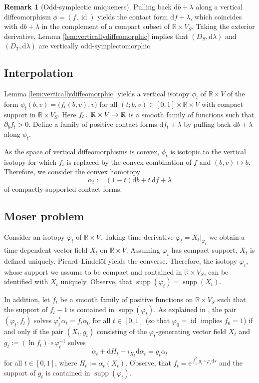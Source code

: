 \documentclass{amsart}
\theoremstyle{definition}
\newtheorem{rem}[prop]{Remark}
\def\co{\colon\thinspace}
\newcommand{\rmd}{\mathrm d}
\newcommand{\rme}{\mathrm e}
\newcommand{\R}{\mathbb R}
\newcommand{\ra}{\rightarrow}
\DeclareMathOperator{\id}{\mathrm{id}}
\DeclareMathOperator{\supp}{\mathrm{supp}}
\begin{document}
\begin{rem}[Odd-symplectic uniqueness]
\label{rem:oddsympuniness}
Pulling back $\rmd b+\lambda$
along a vertical diffeomorphism $\phi=(f,\id)$
yields the contact form $\rmd f+\lambda$,
which coincides with $\rmd b+\lambda$ in the complement
of a compact subset of $\R\times V_S$.
Taking the exterior derivative,
Lemma \ref{lem:verticallydiffeomorphic} implies that
$(D_S,\rmd\lambda)$ and $(D_T,\rmd\lambda)$
are vertically odd-symplectomorphic.
\end{rem}




\subsection{Interpolation}
\label{subsec:interpolation}


Lemma \ref{lem:verticallydiffeomorphic} yields a
vertical isotopy $\phi_t$ of $\R\times V$
of the form $\phi_t(b,v)=\big(f_t(b,v),v\big)$
for all $(t;b,v)\in[0,1]\times\R\times V$
with compact support in $\R\times V_S$.
Here $f_t\co\R\times V\ra\R$ is a smooth family of functions
such that $\partial_bf_t>0$.
Define a family of positive contact forms
$\rmd f_t+\lambda$ by pulling back
$\rmd b+\lambda$ along $\phi_t$.

As the space of vertical diffeomorphisms is convex,
$\phi_t$ is isotopic to the vertical isotopy
for which $f_t$ is replaced by the convex combination
of $f$ and $(b,v)\mapsto b$.
Therefore, we consider the convex homotopy
\[
\alpha_t:=(1-t)\rmd b+t\,\rmd f+\lambda
\]
of compactly supported contact forms.




\subsection{Moser problem}
\label{subsec:moserproblem}


Consider an isotopy $\varphi_t$ of $\R\times V$.
Taking time-derivative $\dot{\varphi_t}=X_t|_{\varphi_t}$
we obtain a time-dependent vector field $X_t$ on $\R\times V$.
Assuming $\varphi_t$ has compact support,
$X_t$ is defined uniquely.
Picard--Lindel\"of yields the converse.
Therefore, the isotopy $\varphi_t$,
whose support we assume to be compact
and contained in $\R\times V_S$,
can be identified with $X_t$ uniquely.
Observe, that $\supp(\varphi_t)=\supp(X_t)$.

In addition,
let $f_t$ be a smooth family of positive functions on $\R\times V_S$
such that the support of $f_t-1$ is contained in $\supp(\varphi_t)$.
As explained in \cite{gei08},
the pair $(\varphi_t,f_t)$ solves $\varphi_t^*\alpha_t=f_t\alpha_0$
for all $t\in[0,1]$
(so that $\varphi_0=\id$ implies $f_0=1$)
if and only if
the pair $(X_t,g_t)$ consisting of the $\varphi_t$-generating
vector field $X_t$ and $g_t:=(\ln f_t)\,\dot{}\circ\varphi_t^{-1}$
solves
\[
\dot\alpha_t+\rmd H_t+i_{X_t}\rmd\alpha_t=g_t\alpha_t
\]
for all $t\in[0,1]$,
where $H_t:=\alpha_t(X_t)$.
Observe, that $f_t=\rme^{\int_0^tg_s\circ\varphi_s\rmd s}$
and the support of $g_t$ is contained in $\supp(\varphi_t)$.
\end{document}
